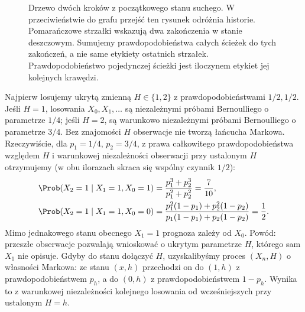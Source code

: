 \begin{figure}[htbp]
\centering
{}
\caption{Drzewo dwóch kroków z początkowego stanu suchego.
W przeciwieństwie do grafu przejść ten rysunek odróżnia
historie. Pomarańczowe strzałki wskazują dwa zakończenia
w stanie deszczowym. Sumujemy prawdopodobieństwa
całych ścieżek do tych zakończeń, a nie same etykiety
ostatnich strzałek. Prawdopodobieństwo pojedynczej
ścieżki jest iloczynem etykiet jej kolejnych krawędzi.}
\label{fig:rp1-12-weather-paths}
\end{figure}

\begin{przyklad}
Najpierw losujemy ukrytą zmienną $H\in\{1,2\}$
z prawdopodobieństwami $1/2,1/2$. Jeśli $H=1$,
losowania $X_0,X_1,\ldots$ są niezależnymi próbami
Bernoulliego o parametrze $1/4$; jeśli $H=2$,
są warunkowo niezależnymi próbami Bernoulliego
o parametrze $3/4$. Bez znajomości $H$
obserwacje nie tworzą łańcucha Markowa.
Rzeczywiście, dla $p_1=1/4$, $p_2=3/4$,
z prawa całkowitego prawdopodobieństwa względem
$H$ i warunkowej niezależności obserwacji przy
ustalonym $H$ otrzymujemy (w obu ilorazach
skraca się wspólny czynnik $1/2$):
\begin{align*}
\Prob(X_2=1\mid X_1=1,X_0=1)
&=\frac{p_1^3+p_2^3}{p_1^2+p_2^2}=\frac7{10},\\
\Prob(X_2=1\mid X_1=1,X_0=0)
&=\frac{p_1^2(1-p_1)+p_2^2(1-p_2)}
{p_1(1-p_1)+p_2(1-p_2)}=\frac12.
\end{align*}
Mimo jednakowego stanu obecnego $X_1=1$ prognoza
zależy od $X_0$. Powód: przeszłe obserwacje
pozwalają wnioskować o ukrytym parametrze $H$,
którego sam $X_1$ nie opisuje. Gdyby do stanu
dołączyć $H$, uzyskalibyśmy proces $(X_n,H)$
o własności Markowa: ze stanu $(x,h)$ przechodzi on
do $(1,h)$ z prawdopodobieństwem $p_h$, a do
$(0,h)$ z prawdopodobieństwem $1-p_h$.
Wynika to z warunkowej niezależności kolejnego
losowania od wcześniejszych przy ustalonym $H=h$.
\end{przyklad}

